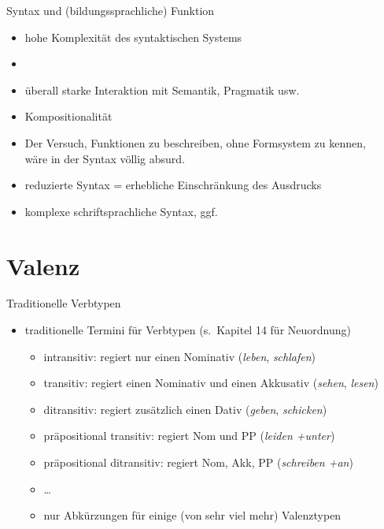 \begin{frame}
  {Syntax und (bildungssprachliche) Funktion}
  \pause
  \begin{itemize}[<+->]
    \item \alert{hohe Komplexität} des syntaktischen Systems
    \item {}
    \item überall \alert{starke Interaktion mit Semantik, Pragmatik usw.}
    \item \alert{Kompositionalität}
      \Zeile
    \item Der Versuch, Funktionen zu beschreiben, ohne Formsystem zu kennen,\\
      wäre in der Syntax völlig absurd.
      \Zeile
    \item reduzierte Syntax = erhebliche Einschränkung des Ausdrucks
    \item komplexe schriftsprachliche Syntax, ggf.\ 
  \end{itemize}
\end{frame}


\section{Valenz}

\begin{frame}
  {Traditionelle Verbtypen}
  \pause
  \begin{itemize}[<+->]
    \item traditionelle Termini für Verbtypen (s.\ Kapitel 14 für Neuordnung)
      \begin{itemize}[<+->]
        \item \alert{intransitiv}: regiert nur einen Nominativ (\textit{leben}, \textit{schlafen})
        \item \alert{transitiv}: regiert einen Nominativ und einen Akkusativ (\textit{sehen}, \textit{lesen})
        \item \alert{ditransitiv}: regiert zusätzlich einen Dativ (\textit{geben}, \textit{schicken})
        \item \alert{präpositional transitiv}: regiert Nom und PP (\textit{leiden +unter})
        \item \alert{präpositional ditransitiv}: regiert Nom, Akk, PP (\textit{schreiben +an})
        \item \ldots
          \Zeile
        \item nur Abkürzungen für einige (von sehr viel mehr) \alert{Valenztypen}
      \end{itemize}
  \end{itemize}
\end{frame}

